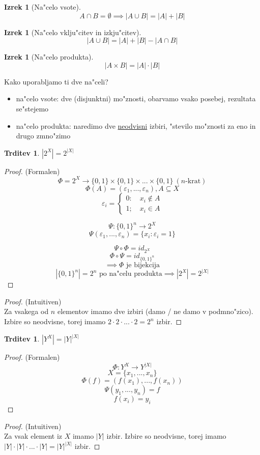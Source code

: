 \documentclass[a4paper,12pt]{article}
\theoremstyle{definition}
\newtheorem{claim}[counter]{Trditev}
\newtheorem{theorem}[counter]{Izrek}
\theoremstyle{remark}
\begin{document}
\begin{theorem}[Na"celo vsote]
	\[
	A \cap B = \emptyset \implies |A \cup B| = |A| + |B|
	\]
\end{theorem}

\begin{theorem}[Na"celo vklju"citev in izkju"citev]
	\[
	|A \cup B| = |A| + |B| - |A \cap B|
	\]
\end{theorem}


\begin{theorem}[Na"celo produkta]
	\[
	|A\times B| = |A|\cdot|B|
	\]
\end{theorem}

Kako uporabljamo ti dve na"celi?
\begin{itemize}
	\item na"celo vsote: dve (disjunktni) mo"znosti, obarvamo vsako posebej, rezultata se"stejemo
	\item na"celo produkta: naredimo dve \underline{neodvisni} izbiri, "stevilo mo"znosti za eno in drugo zmno"zimo
\end{itemize}

\begin{claim}
	$|2^X| = 2^{|X|}$
\end{claim}


\begin{proof}
	(Formalen)
	\[\Phi = 2^X \rightarrow \{0, 1\}\times\{0, 1\}\times...\times\{0, 1\} \ (n\text{-krat})\]
	\[\Phi(A) = (\varepsilon_1, ..., \varepsilon_n), A \subseteq X\]
	\[\varepsilon_i = \begin{cases}0: \quad x_i \notin A  \\ 1; \quad x_i \in A \end{cases}\]


	\[
	\Psi : \{0, 1\}^n \rightarrow 2^X
	\]
	\[
	\Psi (\varepsilon_1, ..., \varepsilon_n) = \{x_i : \varepsilon_i = 1\}
	\]


	\[\Psi \circ \Phi = id_{2^X}\]
	\[\Phi \circ \Psi = id_{\{0, 1\}^n}\]
	\[\implies \Phi \text{ je bijekcija}\]
	\[|\{0, 1\}^n| = 2^n \text{ po na"celu produkta}\implies |2^X| = 2^{|X|}\]
\end{proof}
\begin{proof}
	(Intuitiven)\\
	Za vsakega od $n$ elementov imamo dve izbiri (damo / ne damo v podmno"zico).
	Izbire so neodvisne, torej imamo
	$2 \cdot 2 \cdot ...\cdot 2 = 2^n$
	izbir.
\end{proof}

\begin{claim}
	$|Y^X| = |Y|^{|X|}$
\end{claim}
\begin{proof}(Formalen)
	\[\Phi : Y^X \rightarrow Y^{|X|}\]
	\[X = \{x_1, ..., x_n\}\]
	\[\Phi (f) = (f(x_1), ..., f(x_n))\]
	\[\Psi (y_1, ..., y_n) = f\]
	\[f(x_i) = y_i\]
\end{proof}
\begin{proof}(Intuitiven)\\
	Za vsak element iz $X$ imamo $|Y|$ izbir. Izbire so neodvisne, torej imamo $|Y|\cdot|Y|\cdot ... \cdot|Y| = |Y|^{|X|}$ izbir.
\end{proof}
\end{document}
